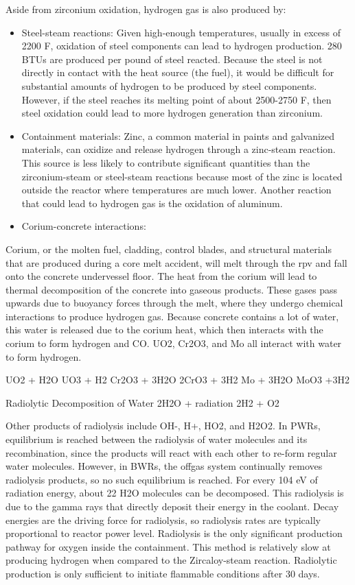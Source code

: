 \documentclass[10pt]{article}
\begin{document}
Aside from zirconium oxidation, hydrogen gas is also produced by:

\begin{itemize}
\item Steel-steam reactions: Given high-enough temperatures, usually in excess of 2200 F, oxidation of steel components can lead to hydrogen production. 280 BTUs are produced per pound of steel reacted. Because the steel is not directly in contact with the heat source (the fuel), it would be difficult for substantial amounts of hydrogen to be produced by steel components. However, if the steel reaches its melting point of about 2500-2750 F, then steel oxidation could lead to more hydrogen generation than zirconium. 
\item Containment materials: Zinc, a common material in paints and galvanized materials, can oxidize and release hydrogen through a zinc-steam reaction. This source is less likely to contribute significant quantities than the zirconium-steam or steel-steam reactions because most of the zinc is located outside the reactor where temperatures are much lower. Another reaction that could lead to hydrogen gas is the oxidation of aluminum. 
\item Corium-concrete interactions:
\end{itemize}



Corium, or the molten fuel, cladding, control blades, and structural materials that are produced during a core melt accident, will melt through the \gls{rpv} and fall onto the concrete undervessel floor. The heat from the corium will lead to thermal decomposition of the concrete into gaseous products. These gases pass upwards due to buoyancy forces through the melt, where they undergo chemical interactions to produce hydrogen gas. Because concrete contains a lot of water, this water is released due to the corium heat, which then interacts with the corium to form hydrogen and CO. UO2, Cr2O3, and Mo all interact with water to form hydrogen. 

UO2 + H2O  UO3 + H2
Cr2O3 + 3H2O  2CrO3 + 3H2
Mo + 3H2O  MoO3 +3H2

Radiolytic Decomposition of Water
2H2O + radiation  2H2 + O2

Other products of radiolysis include OH-, H+, HO2, and H2O2. In PWRs, equilibrium is reached between the radiolysis of water molecules and its recombination, since the products will react with each other to re-form regular water molecules. However, in BWRs, the offgas system continually removes radiolysis products, so no such equilibrium is reached. For every 104 eV of radiation energy, about 22 H2O molecules can be decomposed. This radiolysis is due to the gamma rays that directly deposit their energy in the coolant. Decay energies are the driving force for radiolysis, so radiolysis rates are typically proportional to reactor power level. Radiolysis is the only significant production pathway for oxygen inside the containment. This method is relatively slow at producing hydrogen when compared to the Zircaloy-steam reaction. Radiolytic production is only sufficient to initiate flammable conditions after 30 days.
\end{document}
